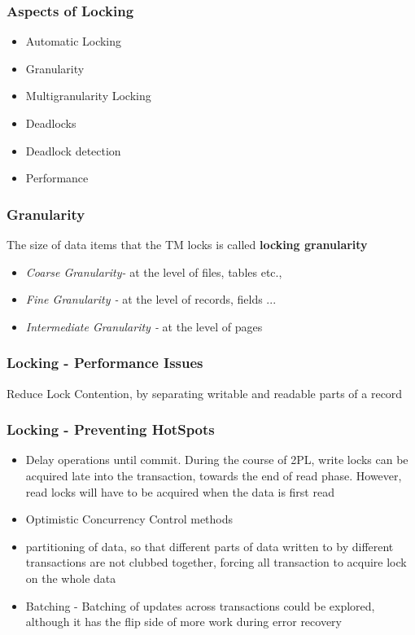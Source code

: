 \documentclass[12]{beamer}
\begin{document}
\begin{frame}
  \frametitle{Aspects of Locking}
  \begin{itemize}
	\item Automatic Locking
	\item Granularity
	\item Multigranularity Locking
	\item Deadlocks
	\item Deadlock detection
	\item Performance
  \end{itemize}
\end{frame}

\begin{frame}
  \frametitle{Granularity}
  \begin{definition}The size of data items that the TM locks is called \textbf{locking granularity}\end{definition}
  \begin{itemize}
    \item \textit{Coarse Granularity-} at the level of files, tables etc.,
    \item \textit{Fine Granularity -} at the level of records, fields ...
    \item \textit{Intermediate Granularity -} at the level of pages
  \end{itemize}
\end{frame}

\begin{frame}
	\frametitle{Locking - Performance Issues}
  Reduce Lock Contention, by separating writable and readable parts of a record
\end{frame}

\begin{frame}
\frametitle{Locking - Preventing HotSpots}
\begin{itemize}
\item Delay operations until commit. During the course of 2PL, write locks can be acquired late into the transaction, towards the end of read phase. However, read locks will have to be acquired when the data is first read
\item Optimistic Concurrency Control methods
\item partitioning of data, so that different parts of data written to by different transactions are not clubbed together, forcing all transaction to acquire lock on the whole data
\item Batching - Batching of updates across transactions could be explored, although it has the flip side of more work during error recovery
\end{itemize}
\end{frame}
\end{document}
